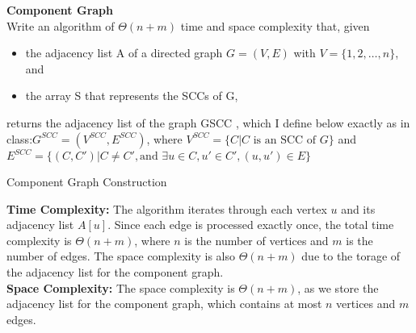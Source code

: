 \textbf{Component Graph} \\
Write an algorithm of $\Theta(n+ m)$ time and space complexity that, given
\begin{itemize}
    \item the adjacency list A of a directed graph $G= (V,E)$ with $V= \{1,2,\ldots,n\}$, and
    \item the array S that represents the SCCs of G,
\end{itemize} 
returns the adjacency list of the graph GSCC , which I define below exactly as in class:$G^{SCC} = (V^{SCC} ,E^{SCC})$,
where $V^{SCC} = \{C |C \text{ is an SCC of } G\}$ and $E^{SCC} = \{(C,C') |C  \ne C', \text{and } \exists u \in C,u'  \in C',(u,u') \in E\}$

\begin{customsolutionbox}
    \begin{algorithm}[H]
    \caption{Component Graph Construction}
    \end{algorithm}
    \textbf{Time Complexity:} The algorithm iterates through each vertex $u$ and its adjacency list $A[u]$.
    Since each edge is processed exactly once, the total time complexity is $\Theta(n + m)$, where $n$ is the 
    number of vertices and $m$ is the number of edges. The space complexity is also $\Theta(n + m)$ due to the 
    torage of the adjacency list for the component graph. \\
    \textbf{Space Complexity:} The space complexity is $\Theta(n + m)$, as we store the adjacency list for the component graph, which contains at most $n$ vertices and $m$ edges.
\end{customsolutionbox}
